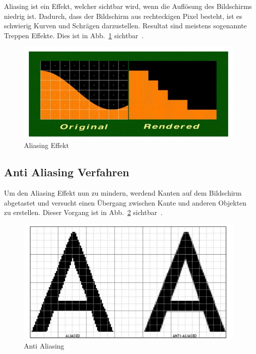 Aliasing ist ein Effekt, welcher sichtbar wird, wenn die Auflösung des Bildschirms niedrig ist.
Dadurch, dass der Bildschirm aus rechteckigen Pixel besteht, ist es schwierig Kurven und Schrägen darzustellen.
Resultat sind meistens sogenannte Treppen Effekte.
Dies ist in Abb.~\ref{fig:aliasing} sichtbar~\cite{Hale_2019}.

\begin{figure}
    \centering
    \includegraphics[scale=0.5]{pics/aliasing}
    \caption{Aliasing Effekt~\cite{Hale_2019}}
    \label{fig:aliasing}
\end{figure}

\subsection{Anti Aliasing Verfahren}
\label{subsec:anti-aliasing-verfahren}

Um den Aliasing Effekt nun zu mindern, werdend Kanten auf dem Bildschirm abgetastet und versucht einen Übergang zwischen Kante und anderen Objekten zu erstellen.
Dieser Vorgang ist in Abb.~\ref{fig:anti-aliasing} sichtbar~\cite{Hale_2019}.

\begin{figure}
    \centering
    \includegraphics[scale=0.4]{pics/anti_aliasing}
    \caption{Anti Aliasing~\cite{Hale_2019}}
    \label{fig:anti-aliasing}
\end{figure}



